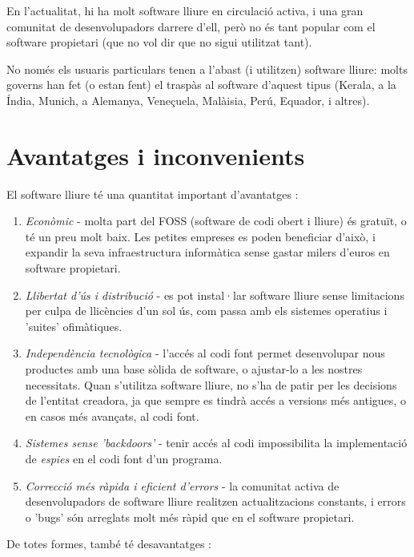 En l'actualitat, hi ha molt software lliure en circulació activa, i una gran comunitat de desenvolupadors darrere d'ell, però no és tant popular com el software propietari (que no vol dir que no sigui utilitzat tant).

No només els usuaris particulars tenen a l'abast (i utilitzen) software lliure: molts governs han fet (o estan fent) el traspàs al software d'aquest tipus (Kerala, a la Índia, Munich, a Alemanya, Veneçuela, Malàisia, Perú, Equador, i altres). \cite{fossadopters}

\section{Avantatges i inconvenients}

El software lliure té una quantitat important d'avantatges  \cite{fossadvantages}:

\begin{enumerate}
\item \emph{Econòmic} - molta part del FOSS (software de codi obert i lliure) és gratuït, o té un preu molt baix. Les petites empreses es poden beneficiar d'això, i expandir la seva infraestructura informàtica sense gastar milers d'euros en software propietari.
\item \emph{Llibertat d'ús i distribució} - es pot instal·lar software lliure sense limitacions per culpa de llicències d'un sol ús, com passa amb els sistemes operatius i 'suites' ofimàtiques.
\item \emph{Independència tecnològica} - l'accés al codi font permet desenvolupar nous productes amb una base sòlida de software, o ajustar-lo a les nostres necessitats. Quan s'utilitza software lliure, no s'ha de patir per les decisions de l'entitat creadora, ja que sempre es tindrà accés a versions més antigues, o en casos més avançats, al codi font.
\item \emph{Sistemes sense 'backdoors'} - tenir accés al codi impossibilita la implementació de \emph{espies} en el codi font d'un programa.
\item \emph{Correcció més ràpida i eficient d'errors} - la comunitat activa de desenvolupadors de software lliure realitzen actualitzacions constants, i errors o 'bugs' són arreglats molt més ràpid que en el software propietari.
\end{enumerate}

De totes formes, també té desavantatges \cite{gentegeek}:


